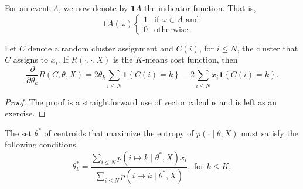 For an event $A$, we now denote by $\mathbf{1}{A}$ the indicator function. That is,
%
\begin{equation}
\mathbf{1}{A}(\omega)
\begin{cases}
1 & \text{if $\omega \in A$ and}\\
0 & \text{otherwise}.
\end{cases}
\end{equation}
%

\begin{lemma}
Let $C$ denote a random cluster assignment and $C(i)$, for $i \leq N$,
the cluster that $C$ assigns to $x_i$. If $R(\cdot, \cdot, X)$ is the $K$-means cost function, then
%
\begin{equation}
\frac{\partial}{\partial \theta_k} R(C, \theta, X) = 2\theta_k \sum_{i \leq N} \mathbf{1}\left\{C(i) = k\right\} - 2\sum_{i \leq N} x_i \mathbf{1}\left\{C(i) = k\right\}.
\label{eq:deriv_cost_fun_da}
\end{equation}
%
\end{lemma}

\begin{proof}
The proof is a straightforward use of vector calculus and is left as
an exercise.
\end{proof}

\begin{theorem}
The set $\theta^*$ of centroids that maximize the entropy of $p(\cdot \mid \theta, X)$ must satisfy the following conditions.
%
\begin{equation}
\theta^*_k = \frac{\sum_{i \leq N} p\left(i \mapsto k \mid \theta^*, X\right)x_i}{\sum_{i \leq N} p\left(i \mapsto k \mid \theta^*, X\right)},\text{ for $k \leq K$},
\label{eq:thm_stationarity_conds_centroids_da}
\end{equation}
%
\label{thm:centroid_stationarity_cond}
\end{theorem}

